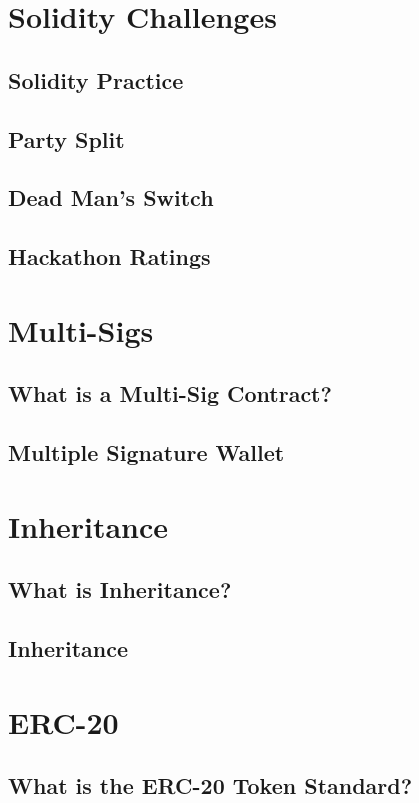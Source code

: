 \documentclass[a4paper, oneside]{book}
\begin{document}
\section{Solidity Challenges}
\subsection{Solidity Practice}
\subsection{Party Split}
\subsection{Dead Man's Switch}
\subsection{Hackathon Ratings}

\section{Multi-Sigs}
\subsection{What is a Multi-Sig Contract?}
\subsection{Multiple Signature Wallet}

\section{Inheritance}
\subsection{What is Inheritance?}
\subsection{Inheritance}

\section{ERC-20}
\subsection{What is the ERC-20 Token Standard?}
\end{document}
